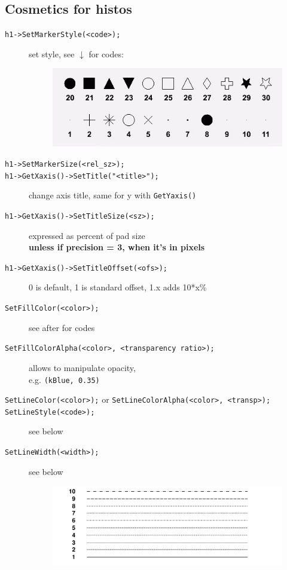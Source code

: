 \documentclass[10pt, twoside]{article}
\newcommand{\ttt}[1]{\colorbox{boxgray}{\texttt{#1}}}
\begin{document}
\subsection{Cosmetics for histos}
\begin{description}
\item[\ttt{h1->SetMarkerStyle(<code>);}] set style, see $\downarrow$ for codes:
\begin{figure}[h!]
\centering
\includegraphics[scale=0.6]{imgs_root/shape.jpg}
\end{figure}
\item[\ttt{h1->SetMarkerSize(<rel\_sz>);}]
\item[\ttt{h1->GetXaxis()->SetTitle("<title>");}] change axis title, same for y with \ttt{GetYaxis()}
\item[\ttt{h1->GetXaxis()->SetTitleSize(<sz>);}] expressed as percent of pad size
\\\textbf{unless if precision = 3, when it's in pixels}
\item[\ttt{h1->GetXaxis()->SetTitleOffset(<ofs>);}] 0 is default, 1 is standard offset, 1.x adds 10*x\% 
\item[\ttt{SetFillColor(<color>);}] see after for codes
\item[\ttt{SetFillColorAlpha(<color>, <transparency ratio>);}] allows to manipulate opacity, \\e.g. \ttt{(kBlue, 0.35)}
\item[\ttt{SetLineColor(<color>);} or  \ttt{SetLineColorAlpha(<color>, <transp>);}]
\item[\ttt{SetLineStyle(<code>);}] see below
\item[\ttt{SetLineWidth(<width>);}] see below
\begin{figure}[H]
\centering
\includegraphics[scale=0.22]{imgs_root/linestyle.png}

\end{figure}
\end{description}
\end{document}
